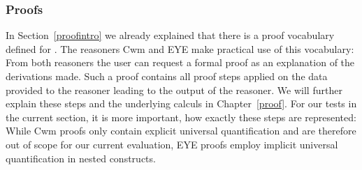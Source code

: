 





\subsubsection{Proofs}\label{pro}
In Section~\ref{proofintro} we already explained that there is a proof vocabulary defined for \nthree. The reasoners Cwm and EYE 
make practical use of this vocabulary: From both reasoners the user can request a formal proof as an explanation of the derivations made. Such a proof contains 
all proof steps applied on the data provided to the reasoner leading to the output of the reasoner. We will further explain these steps and the underlying calculs in Chapter~\ref{proof}.
For our tests in the current section, it is more important, how exactly these steps are represented:
%
%
While Cwm proofs only contain explicit universal 
quantification and are therefore out of scope for our current evaluation, EYE proofs employ implicit universal quantification in nested constructs. 

